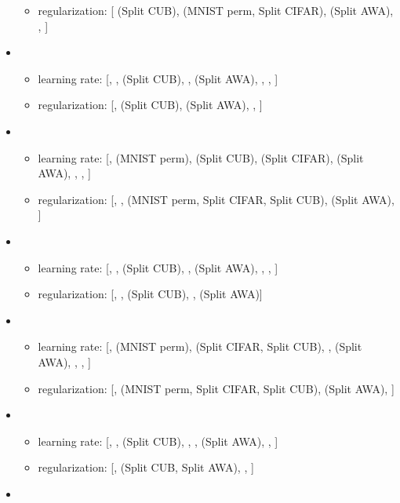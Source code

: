 \begin{itemize}
\begin{itemize}
                        \item regularization: [ (Split CUB),  (MNIST perm, Split CIFAR),  (Split AWA), , ]
                \end{itemize}
        \item {\ewcz}
                \begin{itemize}
                        \item learning rate: [, ,  (Split CUB), ,  (Split AWA), , , ]
                        \item regularization: [,  (Split CUB),  (Split AWA), , ]
                \end{itemize}
        \item {\pii}
                \begin{itemize}
                        \item learning rate: [,  (MNIST perm),  (Split CUB),  (Split CIFAR),  (Split AWA), , , ]
                        \item regularization: [, ,  (MNIST perm, Split CIFAR, Split CUB),  (Split AWA), ]
                \end{itemize}
        \item {\piiz}
                \begin{itemize}
                        \item learning rate: [, ,  (Split CUB), ,  (Split AWA), , , ]
                        \item regularization: [, ,  (Split CUB), ,  (Split AWA)]
                \end{itemize}
        \item {\mas}
                \begin{itemize}
                        \item learning rate: [,  (MNIST perm),  (Split CIFAR, Split CUB), ,  (Split AWA), , , ]
                        \item regularization: [,  (MNIST perm, Split CIFAR, Split CUB),  (Split AWA), ]
                \end{itemize}
        \item {\masz}
                \begin{itemize}
                        \item learning rate: [, ,  (Split CUB), , ,  (Split AWA), , ]
                        \item regularization: [,  (Split CUB, Split AWA), , ]
                \end{itemize}
        \item {\rwalk}

\end{itemize}
